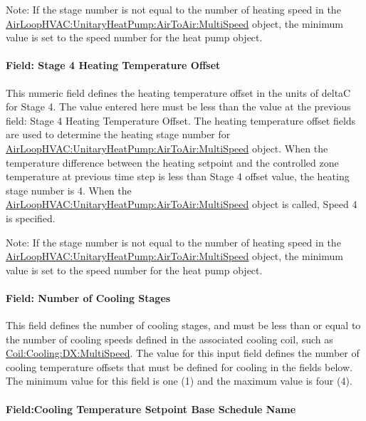 Note: If the stage number is not equal to the number of heating speed in the \hyperref[airloophvacunitaryheatpumpairtoairmultispeed]{AirLoopHVAC:UnitaryHeatPump:AirToAir:MultiSpeed} object, the minimum value is set to the speed number for the heat pump object.

\paragraph{Field: Stage 4 Heating Temperature Offset}\label{field-stage-4-heating-temperature-offset}

This numeric field defines the heating temperature offset in the units of deltaC for Stage 4. The value entered here must be less than the value at the previous field: Stage 4 Heating Temperature Offset. The heating temperature offset fields are used to determine the heating stage number for \hyperref[airloophvacunitaryheatpumpairtoairmultispeed]{AirLoopHVAC:UnitaryHeatPump:AirToAir:MultiSpeed} object. When the temperature difference between the heating setpoint and the controlled zone temperature at previous time step is less than Stage 4 offset value, the heating stage number is 4. When the \hyperref[airloophvacunitaryheatpumpairtoairmultispeed]{AirLoopHVAC:UnitaryHeatPump:AirToAir:MultiSpeed} object is called, Speed 4 is specified.

Note: If the stage number is not equal to the number of heating speed in the \hyperref[airloophvacunitaryheatpumpairtoairmultispeed]{AirLoopHVAC:UnitaryHeatPump:AirToAir:MultiSpeed} object, the minimum value is set to the speed number for the heat pump object.

\paragraph{Field: Number of Cooling Stages}\label{field-number-of-cooling-stages}

This field defines the number of cooling stages, and must be less than or equal to the number of cooling speeds defined in the associated cooling coil, such as \hyperref[coilcoolingdxmultispeed]{Coil:Cooling:DX:MultiSpeed}. The value for this input field defines the number of cooling temperature offsets that must be defined for cooling in the fields below. The minimum value for this field is one (1) and the maximum value is four (4).

\paragraph{Field:Cooling Temperature Setpoint Base Schedule Name}\label{fieldcooling-temperature-setpoint-base-schedule-name}


